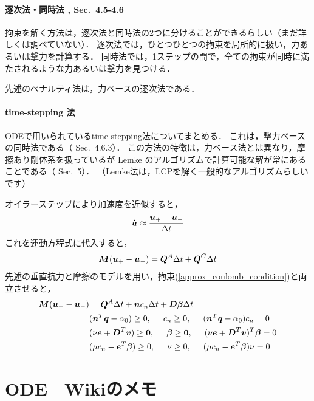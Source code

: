 \documentclass{jsarticle}
\begin{document}
\paragraph{逐次法・同時法 \cite{MThesis2005Garstenauer} , Sec.~4.5-4.6}
拘束を解く方法は，逐次法と同時法の2つに分けることができるらしい（まだ詳しくは調べていない）．
逐次法では，ひとつひとつの拘束を局所的に扱い，力あるいは撃力を計算する．
同時法では，1ステップの間で，全ての拘束が同時に満たされるような力あるいは撃力を見つける．

先述のペナルティ法は，力ベースの逐次法である．

\paragraph{time-stepping 法}
ODEで用いられているtime-stepping法についてまとめる．
これは，撃力ベースの同時法である（\cite{MThesis2005Garstenauer} Sec.~4.6.3）．
この方法の特徴は，力ベース法とは異なり，摩擦あり剛体系を扱っているが Lemke のアルゴリズムで計算可能な解が常にあることである（\cite{IJNME1996Stewart} Sec.~5）．
（Lemke法は，LCPを解く一般的なアルゴリズムらしいです）

オイラーステップにより加速度を近似すると，
\begin{align*}
 \dot{\mbox{\boldmath $u$}} \approx \frac{\mbox{\boldmath $u$}_+-\mbox{\boldmath $u$}_-}{\Delta t}
\end{align*}
これを運動方程式に代入すると，
\begin{align*}
 \mbox{\boldmath $M$}(\mbox{\boldmath $u$}_+-\mbox{\boldmath $u$}_-) = \mbox{\boldmath $Q$}^A \Delta t + \mbox{\boldmath $Q$}^C \Delta t
\end{align*}
先述の垂直抗力と摩擦のモデルを用い，拘束(\ref{approx_coulomb_condition})と両立させると，
\begin{align}
 \mbox{\boldmath $M$}(\mbox{\boldmath $u$}_+-\mbox{\boldmath $u$}_-) &= \mbox{\boldmath $Q$}^A \Delta t + \mbox{\boldmath $n$} c_n \Delta t + \mbox{\boldmath $D$} \mbox{\boldmath $\beta$} \Delta t\\
&(\mbox{\boldmath $n$}^T\mbox{\boldmath $q$}-\alpha_0)\ge0,
\hspace{5mm}c_n\ge0,
\hspace{5mm}(\mbox{\boldmath $n$}^T\mbox{\boldmath $q$}-\alpha_0)c_n=0\notag\\
&(\nu\mbox{\boldmath $e$} + \mbox{\boldmath $D$}^T\mbox{\boldmath $v$})\ge\mbox{\bf 0},
\hspace{5mm}\mbox{\boldmath $\beta$}\ge\mbox{\bf 0},
\hspace{5mm}(\nu\mbox{\boldmath $e$} + \mbox{\boldmath $D$}^T\mbox{\boldmath $v$})^T\mbox{\boldmath $\beta$}=0\notag\\
&(\mu c_n - \mbox{\boldmath $e$}^T\mbox{\boldmath $\beta$})\ge0,
\hspace{5mm}\nu\ge0,
\hspace{5mm}(\mu c_n - \mbox{\boldmath $e$}^T\mbox{\boldmath $\beta$})\nu=0\notag
\end{align}


\section{ODE　Wikiのメモ\cite{WebODEWiki}}
\end{document}
